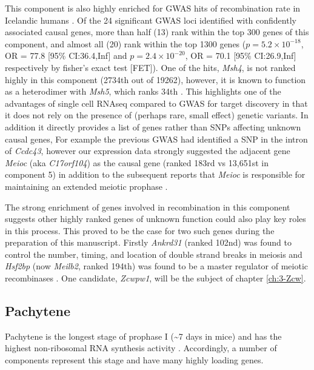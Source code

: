 This component is also highly enriched for GWAS hits of recombination rate in Icelandic humans \parencite{Halldorsson2019Characterizing}.
Of the 24 significant GWAS loci identified with confidently associated causal genes, more than half (13) rank within the top 300 genes of this component, and almost all (20) rank within the top 1300 genes ($p = 5.2\times10^{-18}$, OR = 77.8 [95\% CI:36.4,Inf] and $p = 2.4\times10^{-20}$, OR = 70.1 [95\% CI:26.9,Inf] respectively by fisher's exact test [FET]).
One of the hits, \textit{Msh4}, is not ranked highly in this component (2734th out of 19262), however, it is known to function as a heterodimer with \textit{Msh5}, which ranks 34th \parencite{Rakshambikai2013Structural}.
This highlights one of the advantages of single cell RNAseq compared to GWAS for target discovery in that it does not rely on the presence of (perhaps rare, small effect) genetic variants.
In addition it directly provides a list of genes rather than SNPs affecting unknown causal genes, For example the previous GWAS had identified a SNP in the intron of \textit{Ccdc43}, however our expression data strongly suggested the adjacent gene \textit{Meioc} (aka \textit{C17orf104}) as the causal gene (ranked 183rd vs 13,651st in component 5) in addition to the subsequent reports that \textit{Meioc} is responsible for maintaining an extended meiotic prophase \parencite{Abby2016Implementation, Kong2014Common, Soh2017Meioc}.

The strong enrichment of genes involved in recombination in this component suggests other highly ranked genes of unknown function could also play key roles in this process.
This proved to be the case for two such genes during the preparation of this manuscript.
Firstly \textit{Ankrd31} (ranked 102nd) was found to control the number, timing, and location of double strand breaks in meiosis \parencite{Boekhout2018REC114, Papanikos2018ANKRD31} and \textit{Hsf2bp} (now \textit{Meilb2}, ranked 194th) was found to be a master regulator of meiotic recombinases \parencite{Zhang2019meiosisspecific}.
One candidate, \textit{Zcwpw1}, will be the subject of chapter \ref{ch:3-Zcw}.


\subsection{Pachytene}

Pachytene is the longest stage of prophase I (\textasciitilde7 days in mice) and has the highest non-ribosomal RNA synthesis activity \parencite{Monesi1978Chapter}.
Accordingly, a number of components represent this stage and have many highly loading genes.

